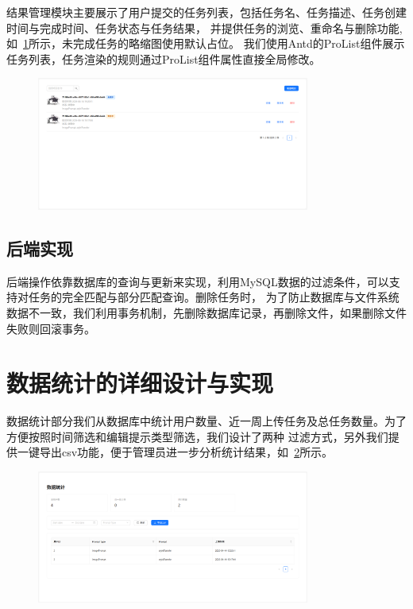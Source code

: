 结果管理模块主要展示了用户提交的任务列表，包括任务名、任务描述、任务创建时间与完成时间、任务状态与任务结果，
并提供任务的浏览、重命名与删除功能,如~\ref{fig:app-result}所示，未完成任务的略缩图使用默认占位。
我们使用Antd的ProList组件展示任务列表，任务渲染的规则通过ProList组件属性直接全局修改。

\begin{figure}[ht]
    \centering
    \includegraphics[width=0.8\textwidth]{source/img/app_result.png}
    \label{fig:app-result}
\end{figure}

\subsection{后端实现}

后端操作依靠数据库的查询与更新来实现，利用MySQL数据的过滤条件，可以支持对任务的完全匹配与部分匹配查询。删除任务时，
为了防止数据库与文件系统数据不一致，我们利用事务机制，先删除数据库记录，再删除文件，如果删除文件失败则回滚事务。

\section{数据统计的详细设计与实现}

数据统计部分我们从数据库中统计用户数量、近一周上传任务及总任务数量。为了方便按照时间筛选和编辑提示类型筛选，我们设计了两种
过滤方式，另外我们提供一键导出csv功能，便于管理员进一步分析统计结果，如~\ref{fig:app-admin}所示。

\begin{figure}[ht]
    \centering
    \includegraphics[width=0.8\textwidth]{source/img/app_admin.png}
    \label{fig:app-admin}
\end{figure}

